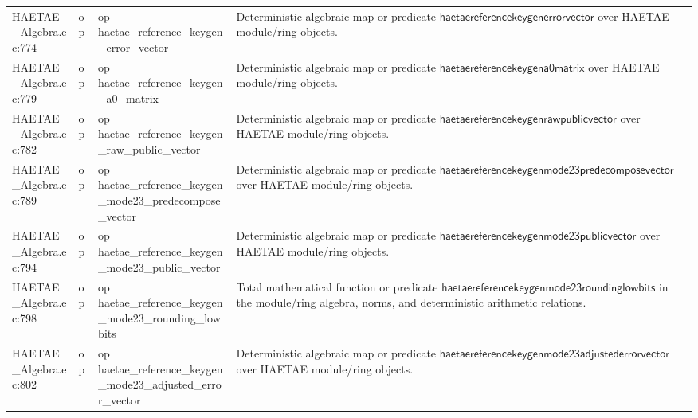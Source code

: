 \documentclass[10pt]{article}
\begin{document}
\begin{longtable}{L{0.11\textwidth}L{0.055\textwidth}L{0.385\textwidth}L{0.41\textwidth}}
HAETAE\_\allowbreak{}Algebra.\allowbreak{}ec:\allowbreak{}774 & op & {\ttfamily\scriptsize op haetae\_\allowbreak{}reference\_\allowbreak{}keygen\_\allowbreak{}error\_\allowbreak{}vector} & Deterministic algebraic map or predicate $\mathsf{haetaereferencekeygenerrorvector}$ over HAETAE module/ring objects. \\
HAETAE\_\allowbreak{}Algebra.\allowbreak{}ec:\allowbreak{}779 & op & {\ttfamily\scriptsize op haetae\_\allowbreak{}reference\_\allowbreak{}keygen\_\allowbreak{}a0\_\allowbreak{}matrix} & Deterministic algebraic map or predicate $\mathsf{haetaereferencekeygena0matrix}$ over HAETAE module/ring objects. \\
HAETAE\_\allowbreak{}Algebra.\allowbreak{}ec:\allowbreak{}782 & op & {\ttfamily\scriptsize op haetae\_\allowbreak{}reference\_\allowbreak{}keygen\_\allowbreak{}raw\_\allowbreak{}public\_\allowbreak{}vector} & Deterministic algebraic map or predicate $\mathsf{haetaereferencekeygenrawpublicvector}$ over HAETAE module/ring objects. \\
HAETAE\_\allowbreak{}Algebra.\allowbreak{}ec:\allowbreak{}789 & op & {\ttfamily\scriptsize op haetae\_\allowbreak{}reference\_\allowbreak{}keygen\_\allowbreak{}mode23\_\allowbreak{}predecompose\_\allowbreak{}vector} & Deterministic algebraic map or predicate $\mathsf{haetaereferencekeygenmode23predecomposevector}$ over HAETAE module/ring objects. \\
HAETAE\_\allowbreak{}Algebra.\allowbreak{}ec:\allowbreak{}794 & op & {\ttfamily\scriptsize op haetae\_\allowbreak{}reference\_\allowbreak{}keygen\_\allowbreak{}mode23\_\allowbreak{}public\_\allowbreak{}vector} & Deterministic algebraic map or predicate $\mathsf{haetaereferencekeygenmode23publicvector}$ over HAETAE module/ring objects. \\
HAETAE\_\allowbreak{}Algebra.\allowbreak{}ec:\allowbreak{}798 & op & {\ttfamily\scriptsize op haetae\_\allowbreak{}reference\_\allowbreak{}keygen\_\allowbreak{}mode23\_\allowbreak{}rounding\_\allowbreak{}lowbits} & Total mathematical function or predicate $\mathsf{haetaereferencekeygenmode23roundinglowbits}$ in the module/ring algebra, norms, and deterministic arithmetic relations. \\
HAETAE\_\allowbreak{}Algebra.\allowbreak{}ec:\allowbreak{}802 & op & {\ttfamily\scriptsize op haetae\_\allowbreak{}reference\_\allowbreak{}keygen\_\allowbreak{}mode23\_\allowbreak{}adjusted\_\allowbreak{}error\_\allowbreak{}vector} & Deterministic algebraic map or predicate $\mathsf{haetaereferencekeygenmode23adjustederrorvector}$ over HAETAE module/ring objects. \\

\end{longtable}
\end{document}
